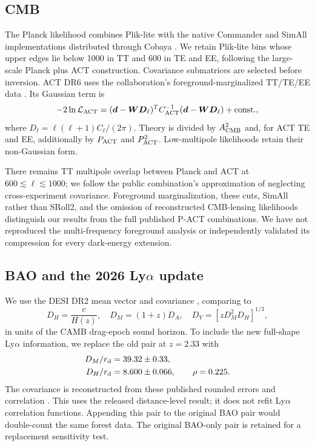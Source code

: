 \documentclass[fleqn,usenatbib]{mnras}
\newcommand{\rd}{r_{\rm d}}
\begin{document}
\subsection{CMB}
The Planck likelihood combines Plik-lite with the native Commander and SimAll
implementations distributed through Cobaya \citep{Planck2020}. We retain
Plik-lite bins whose upper edges lie below 1000 in TT and 600 in TE and EE,
following the large-scale Planck plus ACT construction. Covariance submatrices
are selected before inversion. ACT DR6 uses the collaboration's
foreground-marginalized TT/TE/EE data \citep{ACT2025}. Its Gaussian term is
\begin{equation}
 -2\ln\mathcal{L}_{\rm ACT}
 = (\boldsymbol d-\boldsymbol W\boldsymbol D_\ell)^T
 C_{\rm ACT}^{-1}(\boldsymbol d-\boldsymbol W\boldsymbol D_\ell)
 +\mathrm{const.},
\end{equation}
where $D_\ell=\ell(\ell+1)C_\ell/(2\pi)$. Theory is divided by
$A_{\rm CMB}^2$ and, for ACT TE and EE, additionally by $P_{\rm ACT}$ and
$P_{\rm ACT}^2$. Low-multipole likelihoods retain their non-Gaussian form.

There remains TT multipole overlap between Planck and ACT at
$600\lesssim\ell\lesssim1000$; we follow the public combination's approximation
of neglecting cross-experiment covariance. Foreground marginalization, these
cuts, SimAll rather than SRoll2, and the omission of reconstructed CMB-lensing
likelihoods distinguish our results from the full published P-ACT combinations.
We have not reproduced the multi-frequency foreground analysis or independently
validated its compression for every dark-energy extension.

\subsection{BAO and the 2026 Ly$\alpha$ update}
We use the DESI DR2 mean vector and covariance \citep{DESI2025}, comparing to
\begin{equation}
 D_H=\frac{c}{H(z)},\quad D_M=(1+z)D_A,\quad
 D_V=[zD_M^2D_H]^{1/3},
\end{equation}
in units of the CAMB drag-epoch sound horizon. To include the new full-shape
Ly$\alpha$ information, we replace the old pair at $z=2.33$ with
\begin{align}
 D_M/\rd&=39.32\pm0.33,\\
 D_H/\rd&=8.600\pm0.066,\qquad \rho=0.225.
\end{align}
The covariance is reconstructed from these published rounded errors and
correlation \citep{DESI2026}. This uses the released distance-level result; it
does not refit Ly$\alpha$ correlation functions. Appending this pair to the
original BAO pair would double-count the same forest data. The original
BAO-only pair is retained for a replacement sensitivity test.
\end{document}
